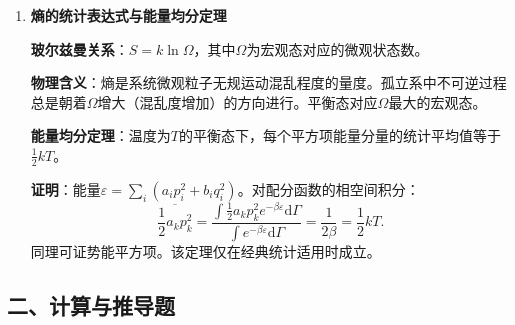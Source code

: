 \documentclass[12pt,a4paper,fontset=mac]{ctexart}
\newcommand{\dd}{\mathrm{d}}
\newcommand{\đ}{\mathrm{đ}}
\begin{document}
\begin{enumerate}
\textbf{玻耳兹曼系统}：可分辨的经典粒子（或满足经典极限条件的量子系统）。分布：$a_l=\omega_l e^{-\alpha-\beta\varepsilon_l}$。

\item \textbf{熵的统计表达式与能量均分定理}

\textbf{玻尔兹曼关系}：$S=k\ln\Omega$，其中$\Omega$为宏观态对应的微观状态数。

\textbf{物理含义}：熵是系统微观粒子无规运动混乱程度的量度。孤立系中不可逆过程总是朝着$\Omega$增大（混乱度增加）的方向进行。平衡态对应$\Omega$最大的宏观态。

\textbf{能量均分定理}：温度为$T$的平衡态下，每个平方项能量分量的统计平均值等于$\frac{1}{2}kT$。

\textbf{证明}：能量$\varepsilon=\sum_i(a_ip_i^2+b_iq_i^2)$。对配分函数的相空间积分：
\[\overline{\frac{1}{2}a_kp_k^2}=\frac{\int\frac{1}{2}a_kp_k^2 e^{-\beta\varepsilon}\dd\Gamma}{\int e^{-\beta\varepsilon}\dd\Gamma}=\frac{1}{2\beta}=\frac{1}{2}kT.\]
同理可证势能平方项。该定理仅在经典统计适用时成立。

\end{enumerate}

\newpage

\subsection*{二、计算与推导题}
\end{document}
